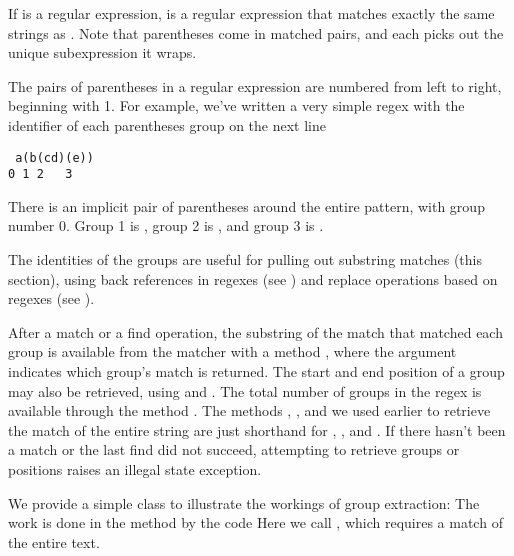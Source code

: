 If  is a regular expression,  is a
regular expression that matches exactly the same strings as
.  Note that parentheses come in matched pairs, and
each picks out the unique subexpression  it wraps.

The pairs of parentheses in a regular expression are numbered
from left to right, beginning with 1.  For example, we've written
a very simple regex with the identifier of each parentheses group
on the next line
%
\begin{verbatim}
 a(b(cd)(e))
0 1 2   3
\end{verbatim}
%
There is an implicit pair of parentheses around the entire pattern,
with group number 0.  Group 1 is ,
group 2 is , and group 3 is .  

The identities of the groups are useful for pulling out substring
matches (this section), using back references in regexes (see
) and replace operations based on regexes (see
). 

After a match or a find operation, the substring of the match that
matched each group is available from the matcher with a method
, where the argument indicates which group's match
is returned.  The start and end position of a group may also be
retrieved, using  and .  The total
number of groups in the regex is available through the method
.  The methods
, , and  we used earlier to
retrieve the match of the entire string are just shorthand for
, , and .  If there hasn't
been a match or the last find did not succeed, attempting to retrieve
groups or positions raises an illegal state exception.

We provide a simple class  to illustrate the workings
of group extraction:
%
%
The work is done in the  method by the code
%
%
Here we call , which requires a match of the
entire text.  

